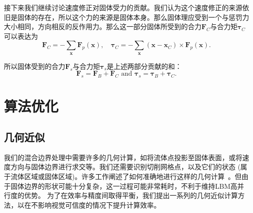 接下来我们继续讨论速度修正对固体受力的贡献。我们认为这个速度修正的来源依旧是固体的存在，所以这个力的来源是固体本身。那么固体理应受到一个与惩罚力大小相同，方向相反的反作用力。那么这一部分固体所受到的合力$\bm{F}_{C}$与合力矩$\bm{\tau}_{C}$可以表达为
\begin{equation}
\bm{F}_{C} = - \sum_{\bm{x}}\bm{F}_p(\bm{x}), \quad \bm{\tau}_{C} = - \sum_{\bm{x}} (\bm{x}-\bm{x}_{C})\times\bm{F}_p(\bm{x}).
\end{equation}

所以固体受到的合力$\bm{F}_s$与合力矩$\bm{\tau}_s$是上述两部分贡献的和：
\begin{equation}
\bm{F}_s = \bm{F}_{B} + \bm{F}_{C} \text{ and } \bm{\tau}_s = \bm{\tau}_{B} + \bm{\tau}_{C}.
\end{equation}

\section{算法优化}
\subsection{几何近似}
我们的混合边界处理中需要许多的几何计算，如将流体点投影至固体表面，或将速度方向与固体边界进行求交等。我们还需要识别切削网格点，以及它们的状态 (属于流体区域或固体区域)。许多工作阐述了如何准确地进行这样的几何计算~\cite{Azevedo-2016,Robinson:2009}。但由于固体边界的形状可能十分复杂，这一过程可能非常耗时，不利于维持LBM高并行度的优势。
为了在效率与精度间取得平衡，我们提出一系列的几何近似计算方法，以在不影响视觉可信度的情况下提升计算效率。

